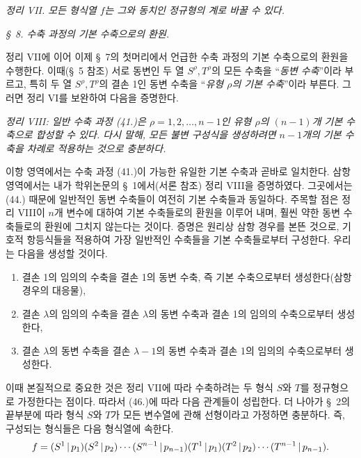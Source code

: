 \emph{정리 VII. 모든 형식열 $f$는 그와 동치인 정규형의 계로 바꿀 수 있다.}

\begin{center}
\emph{\S\ 8. 수축 과정의 기본 수축으로의 환원.}
\end{center}
정리 VII에 이어 이제 \S\ 7의 첫머리에서 언급한 수축 과정의 기본 수축으로의 환원을 수행한다. 이때(\S\ 5 참조) 서로 동변인 두 열 $S^\rho,T^\rho$의 모든 수축을 “\emph{동변 수축}”이라 부르고, 특히 두 열 $S^\rho,T^\rho$의 결손 1인 동변 수축을 “\emph{유형 $\rho$의 기본 수축}”이라 부른다. 그러면 정리 VI를 보완하여 다음을 증명한다.

\emph{정리 VIII: 일반 수축 과정 (41.)은 $\rho=1,2,\ldots,n-1$인 유형 $\rho$의 $(n-1)$개 기본 수축으로 합성할 수 있다. 다시 말해, 모든 불변 구성식을 생성하려면 $n-1$개의 기본 수축을 차례로 적용하는 것으로 충분하다.}

이항 영역에서는 수축 과정 (41.)이 가능한 유일한 기본 수축과 곧바로 일치한다. 삼항 영역에서는 내가 학위논문의 \S\ 1에서(서론 참조) 정리 VIII을 증명하였다. 그곳에서는 (44.) 때문에 일반적인 동변 수축들이 여전히 기본 수축들과 동일하다. 주목할 점은 정리 VIII이 $n$개 변수에 대하여 기본 수축들로의 환원을 이루어 내며, 훨씬 약한 동변 수축들로의 환원에 그치지 않는다는 것이다. 증명은 원리상 삼항 경우를 본뜬 것으로, 기호적 항등식들을 적용하여 가장 일반적인 수축들을 기본 수축들로부터 구성한다. 우리는 다음을 생성할 것이다.
\begin{enumerate}
\renewcommand{\labelenumi}{\arabic{enumi})}
\item 결손 1의 임의의 수축을 결손 1의 동변 수축, 즉 기본 수축으로부터 생성한다(삼항 경우의 대응물),
\item 결손 $\lambda$의 임의의 수축을 결손 $\lambda$의 동변 수축과 결손 1의 임의의 수축으로부터 생성한다,
\item 결손 $\lambda$의 동변 수축을 결손 $\lambda-1$의 동변 수축과 결손 1의 임의의 수축으로부터 생성한다.
\end{enumerate}
이때 본질적으로 중요한 것은 정리 VII에 따라 수축하려는 두 형식 $S$와 $T$를 정규형으로 가정한다는 점이다. 따라서 (46.)에 따라 다음 관계들이 성립한다.
더 나아가 \S\ 2의 끝부분에 따라 형식 $S$와 $T$가 모든 변수열에 관해 선형이라고 가정하면 충분하다. 즉, 구성되는 형식들은 다음 형식열에 속한다.
\[
 f=(S^1\,|\,p_1)(S^2\,|\,p_2)\cdots(S^{n-1}\,|\,p_{n-1})
   (T^1\,|\,p_1)(T^2\,|\,p_2)\cdots(T^{n-1}\,|\,p_{n-1}).
\]

